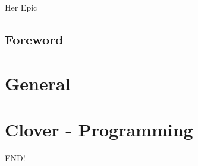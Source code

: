 \documentclass[a4paper,12pt,UTF8]{book}
\begin{document}
\author{dosconio}
\begin{center}
	\sc\fontsize{48pt}{0}\selectfont\textcolor[rgb]{1, 0.381, 0.618}{Her Epic}
\end{center}

\newpage %
\renewcommand{\contentsname}{Contents}
\tableofcontents

\section{Foreword} %

\chapter{General}

\chapter{Clover \mbox{-} Programming}





\newpage
END!%
\end{document}
